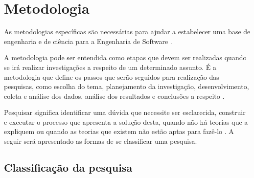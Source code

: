 \chapter{Metodologia}

As metodologias específicas são necessárias para ajudar a estabelecer uma base de engenharia e de ciência para a Engenharia de Software \cite{Wohlin:2000}.

A metodologia pode ser entendida como etapas que devem ser realizadas quando se irá realizar investigações a respeito de um determinado assunto. É a metodologia que define os passos que serão seguidos para realização das pesquisas, como escolha do tema, planejamento da investigação, desenvolvimento, coleta e análise dos dados, análise dos resultados e conclusões a respeito \cite{Moresi:2003}.

Pesquisar significa identificar uma dúvida que necessite ser esclarecida, construir e executar o processo que apresenta a solução desta, quando não há teorias que a expliquem ou quando as teorias que existem não estão aptas para fazê-lo \cite{Koche:1997}. A seguir será apresentado as formas de se classificar uma pesquisa.

\section{Classificação da pesquisa}

